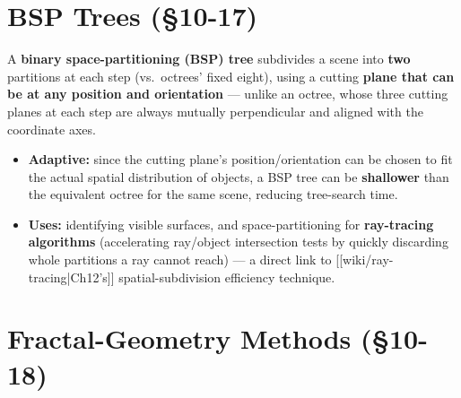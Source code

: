 \documentclass[12pt, a4paper]{article}
\newenvironment{answerbox}{\begin{mdframed}[style=answerframe]}{\end{mdframed}}
\begin{document}
\section{BSP Trees (\S10-17)}
\begin{answerbox}
A \textbf{binary space-partitioning (BSP) tree} subdivides a scene into \textbf{two} partitions at each step (vs.\ octrees' fixed eight), using a cutting \textbf{plane that can be at any position and orientation} — unlike an octree, whose three cutting planes at each step are always mutually perpendicular and aligned with the coordinate axes.
\begin{itemize}[noitemsep]
  \item \textbf{Adaptive:} since the cutting plane's position/orientation can be chosen to fit the actual spatial distribution of objects, a BSP tree can be \textbf{shallower} than the equivalent octree for the same scene, reducing tree-search time.
  \item \textbf{Uses:} identifying visible surfaces, and space-partitioning for \textbf{ray-tracing algorithms} (accelerating ray/object intersection tests by quickly discarding whole partitions a ray cannot reach) — a direct link to [[wiki/ray-tracing|Ch12's]] spatial-subdivision efficiency technique.
\end{itemize}
\end{answerbox}

\section{Fractal-Geometry Methods (\S10-18)}
\end{document}
